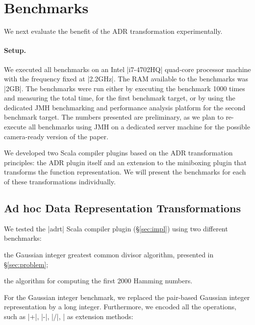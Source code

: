 \section{Benchmarks}
\label{sec:benchmarks}


We next evaluate the benefit of the ADR transformation experimentally.

\paragraph{Setup.} We executed all benchmarks on an Intel |i7-4702HQ| quad-core processor
machine with the frequency fixed at |2.2GHz|. The RAM available to the
benchmarks was |2GB|. The benchmarks were run either by executing the
benchmark 1000 times and measuring the total time, for the first
benchmark target, or by using the dedicated JMH benchmarking and
performance analysis platform \cite{aleksey_shipilev_openjdk:_????}
for the second benchmark target. The numbers presented are
preliminary, as we plan to re-execute all benchmarks using JMH on a
dedicated server machine for the possible camera-ready version of the paper.

We developed two Scala compiler plugins based on the ADR
transformation principles: the ADR plugin itself and an extension to
the miniboxing plugin \cite{miniboxing} that transforms the function
representation. We will present the benchmarks for each of these
transformations individually.

\subsection{Ad hoc Data Representation Transformations}
\label{sec:benchmarks:ad-hoc}

We tested the |adrt| Scala compiler plugin (\S\ref{sec:impl}) using two different benchmarks:

\begin{compactitem}
\item the Gaussian integer greatest common divisor algorithm, presented in \S\ref{sec:problem};
\item the algorithm for computing the first 2000 Hamming numbers.
\end{compactitem}

For the Gaussian integer benchmark, we replaced the pair-based Gaussian integer representation by a long integer. Furthermore, we encoded all the operations, such as |+|, |-|, |/|, |%
as extension methods:

